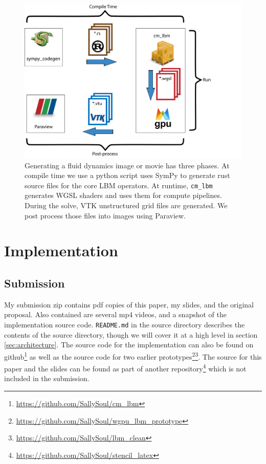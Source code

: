\begin{figure}
\begin{center}
\includegraphics[width=\linewidth]{workflow.png}
\end{center}
  \caption{Generating a fluid dynamics image or movie
    has three phases. At compile time we use a
    python script uses SymPy to generate
  rust source files for the core LBM operators.
  At runtime, \lstinline{cm_lbm} generates WGSL shaders
  and uses them for compute pipelines.
  During the solve, VTK unstructured grid files are
  generated. 
  We post process those files into images using Paraview.
}
  \label{fig:architecture}
\end{figure}

\section{Implementation}\label{sec:implementation}
\subsection{Submission}
My submission zip contains pdf copies of this paper, my slides, and the original proposal. 
Also contained are
several mp4 videos, and a snapshot of the implementation source code.
\lstinline{README.md} in the source directory describes the contents
of the source directory,
though we will cover it at a high level in section \ref{sec:architecture}. 
The source code for the implementation can also be found on 
github\footnote{\url{https://github.com/SallySoul/cm_lbm}}
as well as the source code for two earlier 
prototypes\footnote{\url{https://github.com/SallySoul/wgpu_lbm_prototype}}\footnote{\url{https://github.com/SallySoul/lbm_clean}}.
The source for this paper and the slides can be found as 
part of another repository\footnote{\url{https://github.com/SallySoul/stencil_latex}} 
which is not included in the submission.

